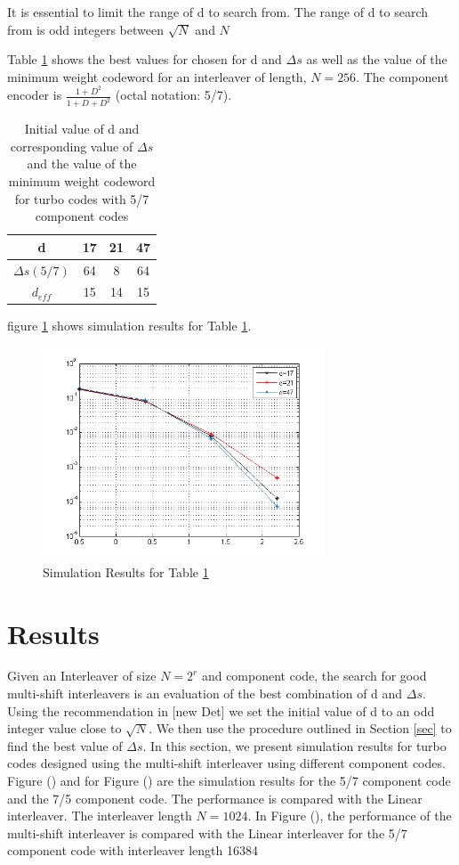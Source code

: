 \documentclass[20 pts]{article}
\begin{document}
 It is essential to limit the range of d to search from. The range of d to search from
 is odd integers between $\sqrt{N}$ and $N$
 
 
 Table \ref{tab1} shows the best values for chosen for d and $\Delta s$
 as well as the value of the minimum weight codeword for an interleaver 
 of length, $N=256$. The component encoder is $\frac{1 + D^2}{1+D+D^2}$ 
 (octal notation: 5/7).
 
 \begin{table}[h!]
\centering
\begin{tabular}{||c |c |c |c||} 
 \hline
 d & 17 & 21 & 47\\ [0.5ex] 
 \hline\hline
 $\Delta s(5/7)$ & 64 & 8 & 64 \\ 
 \hline
  $d_{eff}$ & 15 & 14 & 15  \\ [1ex] 
 \hline
\end{tabular}
\caption{Initial value of d and corresponding value of $\Delta s$ 
and the value of the minimum weight codeword for
 turbo codes with 5/7 component codes}
\label{tab1}
\end{table}

 figure \ref{comp1} shows simulation results for Table \ref{tab1}.
\begin{figure}[h!]
\centering
		\includegraphics[width=0.75\textwidth]{comparison1.png}
		\caption{Simulation Results for Table \ref{tab1}}
		\label{comp1}
		\end{figure}
\section{Results}
Given an Interleaver of size $N=2^r$ and component code, the search for good
multi-shift interleavers is an evaluation of the best combination of d and $\Delta s$.
Using the recommendation in [new Det] we set the initial value of d to an odd integer
value close to $\sqrt{N}$. We then use the procedure outlined in Section \ref{sec}
to find the best value of $\Delta s$. In this section, we present simulation results
for turbo codes designed using the multi-shift interleaver using different component
codes.
 Figure () and for  Figure () are the simulation results for the 5/7 component code
 and the 7/5 component code. The performance is compared with the Linear interleaver.
The interleaver length $N=1024$. In Figure (), the performance of the multi-shift 
interleaver is compared with the Linear interleaver  for the 
5/7 component code with interleaver length 16384
\end{document}
